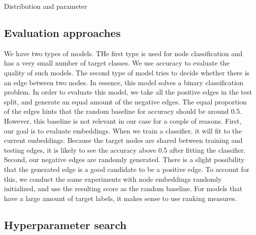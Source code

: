 \documentclass[a4paper,twoside]{article}
\begin{document}
Distribution and parameter

\subsection{Evaluation approaches}

We have two types of models. THe first type is used for node classification and has a very small number of target classes. We use accuracy to evaluate the quality of such models. The second type of model tries to decide whether there is an edge between two nodes. In essence, this model solves a binary classification problem. In order to evaluate this model, we take all the positive edges in the test split, and generate an equal amount of the negative edges. The equal proportion of the edges hints that the random baseline for accuracy should be around 0.5. However, this baseline is not relevant in our case for a couple of reasons. First, our goal is to evaluate embeddings. When we train a classifier, it will fit to the current embeddings. Because the target nodes are shared between training and testing edges, it is likely to see the accuracy above 0.5 after fitting the classifier. Second, our negative edges are randomly generated. There is a slight possibility that the generated edge is a good candidate to be a positive edge. To account for this, we conduct the same experiments with node embeddings randomly initialized, and use the resulting score as the random baseline.
For models that have a large amount of target labels, it makes sense to use ranking measures. 

\subsection{Hyperparameter search}



{\small
}
\end{document}
